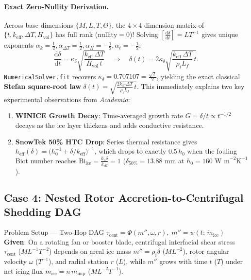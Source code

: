 \documentclass[11pt,a4paper]{article}
\newcommand{\dd}{\mathrm{d}}
\newcommand{\td}[2]{\frac{\dd #1}{\dd #2}}
\newcommand{\dimbr}[1]{\left[#1\right]}
\begin{document}
\paragraph{Exact Zero-Nullity Derivation.}
Across base dimensions $\{M, L, T, \Theta\}$, the $4\times 4$ dimension matrix of $\{t, k_{\text{eff}}, \Delta T, H_{\text{vol}}\}$ has full rank ($\text{nullity} = 0$)! Solving $\dimbr{\td{\delta}{t}} = LT^{-1}$ gives unique exponents $\alpha_k = \tfrac{1}{2}, \alpha_{\Delta T} = \tfrac{1}{2}, \alpha_H = -\tfrac{1}{2}, \alpha_t = -\tfrac{1}{2}$:
\begin{equation}
  \td{\delta}{t} = \kappa_\delta \sqrt{\frac{k_{\text{eff}}\,\Delta T}{H_{\text{vol}}\,t}}
  \quad\Longrightarrow\quad
  \delta(t) = 2\kappa_\delta \sqrt{\frac{k_{\text{eff}}\,\Delta T}{\rho_i L_f}\,t}.
\end{equation}
\texttt{NumericalSolver.fit} recovers $\kappa_\delta = 0.707107 = \tfrac{\sqrt{2}}{2}$, yielding the exact classical \textbf{Stefan square-root law} $\delta(t) = \sqrt{\frac{2 k_{\text{eff}}\Delta T}{\rho_i L_f}\,t}$. This immediately explains two key experimental observations from \emph{Academia}:
\begin{enumerate}[leftmargin=1.5em,itemsep=2pt]
  \item \textbf{WINICE Growth Decay}: Time-averaged growth rate $G = \delta/t \propto t^{-1/2}$ decays as the ice layer thickens and adds conductive resistance.
  \item \textbf{SnowTek 50\% HTC Drop}: Series thermal resistance gives $h_{\text{eff}}(\delta) = \bigl(h_0^{-1} + \delta/k_{\text{eff}}\bigr)^{-1}$, which drops to exactly $0.5\,h_0$ when the fouling Biot number reaches $\mathrm{Bi}_{\text{ice}} = \frac{h_0\delta}{k_{\text{eff}}} = 1$ ($\delta_{50\%} = 13.88\text{ mm}$ at $h_0 = 160\text{ W m}^{-2}\text{K}^{-1}$).
\end{enumerate}

\subsection{Case 4: Nested Rotor Accretion-to-Centrifugal Shedding DAG}

\begin{setupbox}{Problem Setup — Two-Hop DAG $\tau_{\text{cent}} = \Phi(m'', \omega, r),\; m'' = \psi(t;\,\dot{m}_{\text{ice}})$}
\textbf{Given}: On a rotating fan or booster blade, centrifugal interfacial shear stress $\tau_{\text{cent}}$ ($ML^{-1}T^{-2}$) depends on areal ice mass $m'' = \rho_i\delta$ ($ML^{-2}$), rotor angular velocity $\omega$ ($T^{-1}$), and radial station $r$ ($L$), while $m''$ grows with time $t$ ($T$) under net icing flux $\dot{m}_{\text{ice}} = n\,\dot{m}_{\text{imp}}$ ($ML^{-2}T^{-1}$).
\end{setupbox}
\end{document}
